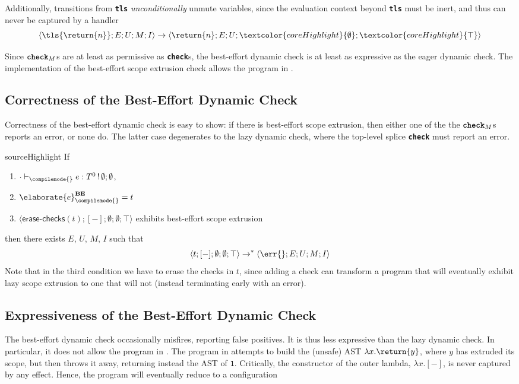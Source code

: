 Additionally, transitions from \textbf{\texttt{tls}} \textit{unconditionally} unmute variables, since the evaluation context beyond \textbf{\texttt{tls}} must be inert, and thus can never be captured by a handler
\[\langle \tls{\return{n}}; E; U; M; I \rangle \to \langle {\return{n}}; E; U; \textcolor{coreHighlight}{\emptyset}; \textcolor{coreHighlight}{\top} \rangle\]

Since $\textbf{\texttt{check}}_M$s are at least as permissive as \textbf{\texttt{check}}s, the best-effort dynamic check is at least as expressive as the eager dynamic check. The implementation of the best-effort scope extrusion check allows the program in . 

\subsection{Correctness of the Best-Effort Dynamic Check}\label{subsection:best-effort-correct}
Correctness of the best-effort dynamic check is easy to show: if there is best-effort scope extrusion, then either one of the the $\textbf{\texttt{check}}_M$s reports an error, or none do. The latter case degenerates to the lazy dynamic check, where the top-level splice \textbf{\texttt{check}} must report an error. 

\begin{theorem}{sourceHighlight} If 
  \begin{enumerate}
    \item $\cdot \vdash_{\compilemode{}} e: T^0 \, ! \, \emptyset;\emptyset$, 
    \item $\elaborate{e}_{\compilemode{}}^{\textbf{BE}} = t$
    \item $\langle \textsf{erase-checks}(t); [-]; \emptyset; \emptyset; \top \rangle$ exhibits best-effort scope extrusion 
  \end{enumerate}
  then there exists $E$, $U$, $M$, $I$ such that \[\langle t; [-]; \emptyset; \emptyset; \top \rangle \to^{*}\langle \err{}; E; U; M; I \rangle\]
Note that in the third condition we have to erase the checks in $t$, since adding a check can transform a program that will eventually exhibit lazy scope extrusion to one that will not (instead terminating early with an error).
\end{theorem}

\subsection{Expressiveness of the Best-Effort Dynamic Check}\label{subsection:best-effort-expressive}
The best-effort dynamic check occasionally misfires, reporting false positives. It is thus less expressive than the lazy dynamic check. In particular, it does not allow the program in . The program in  attempts to build the (unsafe) AST $\lambda x.\return{y}$, where $y$ has extruded its scope, but then throws it away, returning instead the AST of \texttt{1}. Critically, the constructor of the outer lambda, $\lambda x. [-]$, is never captured by any effect. Hence, the program will eventually reduce to a configuration 


